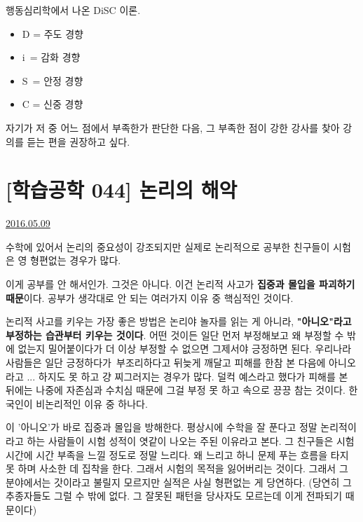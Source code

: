 행동심리학에서 나온 DiSC 이론.
\begin{itemize}
    \item D = 주도 경향
    \item i = 감화 경향
    \item S = 안정 경향
    \item C = 신중 경향
\end{itemize}
\vspace{5mm}

자기가 저 중 어느 점에서 부족한가 판단한 다음, 그 부족한 점이 강한 강사를 찾아 강의를 듣는 편을 권장하고 싶다.
\vspace{5mm}







\section{[학습공학 044] 논리의 해악}
\href{https://www.kockoc.com/Apoc/766355}{2016.05.09}

\vspace{5mm}

수학에 있어서 논리의 중요성이 강조되지만
실제로 논리적으로 공부한 친구들이 시험은 영 형편없는 경우가 많다.
\vspace{5mm}

이게 공부를 안 해서인가.
그것은 아니다. 이건 논리적 사고가 \textbf{집중과 몰입을 파괴하기 때문}이다.
공부가 생각대로 안 되는 여러가지 이유 중 핵심적인 것이다.
\vspace{5mm}

논리적 사고를 키우는 가장 좋은 방법은 논리야 놀자를 읽는 게 아니라, \textbf{"아니오"라고 부정하는 습관부터 키우는 것이다}.
어떤 것이든 일단 먼저 부정해보고 왜 부정할 수 밖에 없는지 밀어붙이다가 더 이상 부정할 수 없으면 그제서야 긍정하면 된다.
우리나라 사람들은 일단 긍정하다가 부조리하다고 뒤늦게 깨달고 피해를 한참 본 다음에 아니오라고 ... 하지도 못 하고 걍 찌그러지는 경우가 많다.
덜컥 예스라고 했다가 피해를 본 뒤에는 나중에 자존심과 수치심 때문에 그걸 부정 못 하고 속으로 끙끙 참는 것이다.
한국인이 비논리적인 이유 중 하나다.
\vspace{5mm}

이 '아니오'가 바로 집중과 몰입을 방해한다.
평상시에 수학을 잘 푼다고 정말 논리적이라고 하는 사람들이 시험 성적이 엿같이 나오는 주된 이유라고 본다.
그 친구들은 시험 시간에 시간 부족을 느낄 정도로 정말 느리다. 왜 느리고 하니 문제 푸는 흐름을 타지 못 하며 사소한 데 집착을 한다.
그래서 시험의 목적을 잃어버리는 것이다. 그래서 그 분야에서는 갓이라고 불릴지 모르지만 실적은 사실 형편없는 게 당연하다.
(당연히 그 추종자들도 그럴 수 밖에 없다. 그 잘못된 패턴을 당사자도 모르는데 이게 전파되기 때문이다)
\vspace{5mm}

